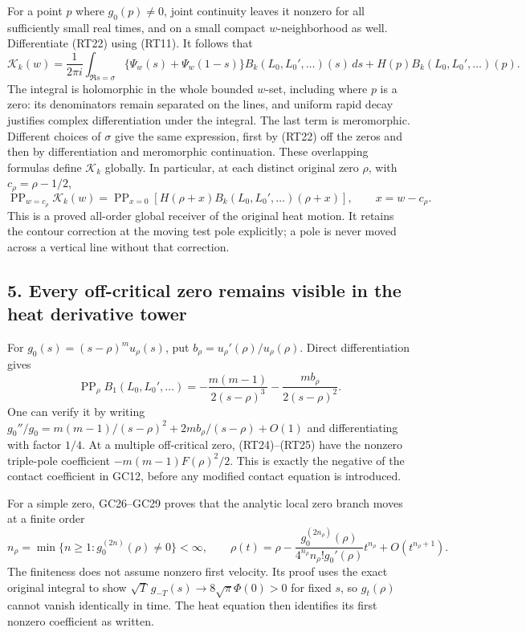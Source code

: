 \documentclass[
  10pt,
  a4paper,
]{article}
\begin{document}
For a point \(p\) where \(g_0(p)\ne0\), joint continuity leaves it
nonzero for all sufficiently small real times, and on a small compact
\(w\)-neighborhood as well. Differentiate (RT22) using (RT11). It
follows that \[
\boxed{
\mathscr K_k(w)=\frac1{2\pi i}\int_{\Re s=\sigma}
\{\Psi_w(s)+\Psi_w(1-s)\}B_k(L_0,L_0',\ldots)(s)\,ds
+H(p)B_k(L_0,L_0',\ldots)(p).}
\tag{RT23}
\] The integral is holomorphic in the whole bounded \(w\)-set, including
where \(p\) is a zero: its denominators remain separated on the lines,
and uniform rapid decay justifies complex differentiation under the
integral. The last term is meromorphic. Different choices of \(\sigma\)
give the same expression, first by (RT22) off the zeros and then by
differentiation and meromorphic continuation. These overlapping formulas
define \(\mathscr K_k\) globally. In particular, at each distinct
original zero \(\rho\), with \(c_\rho=\rho-1/2\), \[
\operatorname{PP}_{w=c_\rho}\mathscr K_k(w)
=\operatorname{PP}_{x=0}
\left[H(\rho+x)B_k(L_0,L_0',\ldots)(\rho+x)\right],
\qquad x=w-c_\rho.
\tag{RT24}
\] This is a proved all-order global receiver of the original heat
motion. It retains the contour correction at the moving test pole
explicitly; a pole is never moved across a vertical line without that
correction.

\subsection{5. Every off-critical zero remains visible in the heat
derivative
tower}\label{every-off-critical-zero-remains-visible-in-the-heat-derivative-tower}

For \(g_0(s)=(s-\rho)^m u_\rho(s)\), put
\(b_\rho=u_\rho'(\rho)/u_\rho(\rho)\). Direct differentiation gives \[
\operatorname{PP}_{\rho}B_1(L_0,L_0',\ldots)
=-\frac{m(m-1)}{2(s-\rho)^3}-\frac{mb_\rho}{2(s-\rho)^2}.
\tag{RT25}
\] One can verify it by writing
\(g_0''/g_0=m(m-1)/(s-\rho)^2+2mb_\rho/(s-\rho)+O(1)\) and
differentiating with factor \(1/4\). At a multiple off-critical zero,
(RT24)--(RT25) have the nonzero triple-pole coefficient
\(-m(m-1)F(\rho)^2/2\). This is exactly the negative of the contact
coefficient in GC12, before any modified contact equation is introduced.

For a simple zero, GC26--GC29 proves that the analytic local zero branch
moves at a finite order \[
n_\rho=\min\{n\ge1:g_0^{(2n)}(\rho)\ne0\}<\infty,
\qquad
\rho(t)=\rho-
\frac{g_0^{(2n_\rho)}(\rho)}{4^{n_\rho}n_\rho!g_0'(\rho)}t^{n_\rho}
+O(t^{n_\rho+1}).
\tag{RT26}
\] The finiteness does not assume nonzero first velocity. Its proof uses
the exact original integral to show
\(\sqrt T\,g_{-T}(s)\to8\sqrt\pi\Phi(0)>0\) for fixed \(s\), so
\(g_t(\rho)\) cannot vanish identically in time. The heat equation then
identifies its first nonzero coefficient as written.
\end{document}

